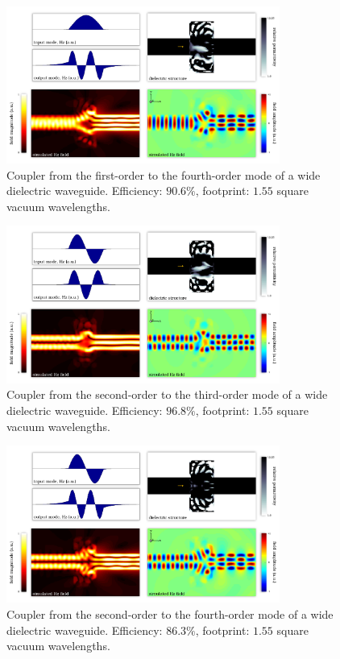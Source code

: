 \begin{figure}[h!]
    \centering
    \includegraphics[width=0.8\textwidth]{p3/8}
    \caption{
        Coupler from the first-order to the fourth-order mode 
            of a wide dielectric waveguide.
        Efficiency: $90.6\%$,
        footprint: $1.55$ square vacuum wavelengths.
        }
\end{figure}
\begin{figure}[h!]
    \centering
    \includegraphics[width=0.8\textwidth]{p3/9}
    \caption{
        Coupler from the second-order to the third-order mode 
            of a wide dielectric waveguide.
        Efficiency: $96.8\%$,
        footprint: $1.55$ square vacuum wavelengths.
        }
\end{figure}
\begin{figure}[h!]
    \centering
    \includegraphics[width=0.8\textwidth]{p3/10}
    \caption{
        Coupler from the second-order to the fourth-order mode 
            of a wide dielectric waveguide.
        Efficiency: $86.3\%$,
        footprint: $1.55$ square vacuum wavelengths.
        }
\end{figure}
